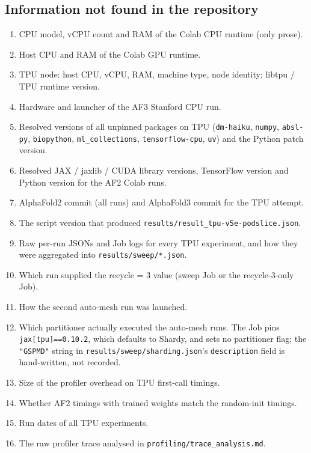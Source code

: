 \subsection{Information not found in the repository}
\label{sec:meth-gaps}

\begin{enumerate}
  \item CPU model, vCPU count and RAM of the Colab CPU runtime (only prose).
  \item Host CPU and RAM of the Colab GPU runtime.
  \item TPU node: host CPU, vCPU, RAM, machine type, node identity; libtpu / TPU runtime version.
  \item Hardware and launcher of the AF3 Stanford CPU run.
  \item Resolved versions of all unpinned packages on TPU (\texttt{dm-haiku}, \texttt{numpy}, \texttt{absl-py}, \texttt{biopython}, \texttt{ml\_collections}, \texttt{tensorflow-cpu}, \texttt{uv}) and the Python patch version.
  \item Resolved JAX / jaxlib / CUDA library versions, TensorFlow version and Python version for the AF2 Colab runs.
  \item AlphaFold2 commit (all runs) and AlphaFold3 commit for the TPU attempt.
  \item The script version that produced \texttt{results/\allowbreak{}result\_\allowbreak{}tpu-v5e-podslice.json}.
  \item Raw per-run JSONs and Job logs for every TPU experiment, and how they were aggregated into \texttt{results/sweep/*.json}.
  \item Which run supplied the recycle = 3 value (sweep Job or the recycle-3-only Job).
  \item How the second auto-mesh run was launched.
  \item Which partitioner actually executed the auto-mesh runs. The Job pins \texttt{jax[tpu]==0.10.2}, which defaults to Shardy, and sets no partitioner flag; the \texttt{"GSPMD"} string in \texttt{results/\allowbreak{}sweep/\allowbreak{}sharding.json}'s \texttt{description} field is hand-written, not recorded. 
  \item Size of the profiler overhead on TPU first-call timings.
  \item Whether AF2 timings with trained weights match the random-init timings.
  \item Run dates of all TPU experiments.
  \item The raw profiler trace analysed in \texttt{profiling/\allowbreak{}trace\_\allowbreak{}analysis.md}.
\end{enumerate}

